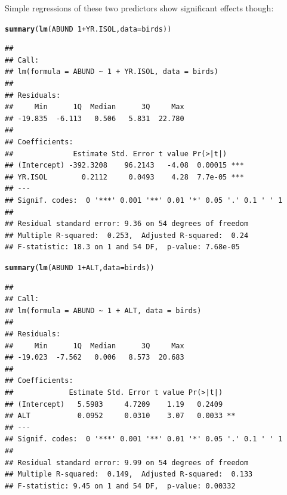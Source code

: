 \documentclass[12pt,a4paper]{scrartcl}\usepackage[]{graphicx}\usepackage[]{color}
\makeatletter
\newcommand{\hlnum}[1]{\textcolor[rgb]{0.686,0.059,0.569}{#1}}%
\newcommand{\hlopt}[1]{\textcolor[rgb]{0,0,0}{#1}}%
\newcommand{\hlstd}[1]{\textcolor[rgb]{0.345,0.345,0.345}{#1}}%
\newcommand{\hlkwc}[1]{\textcolor[rgb]{0.333,0.667,0.333}{#1}}%
\newcommand{\hlkwd}[1]{\textcolor[rgb]{0.737,0.353,0.396}{\textbf{#1}}}%
\newenvironment{kframe}{%
 \def\at@end@of@kframe{}%
 \ifinner\ifhmode%
  \def\at@end@of@kframe{\end{minipage}}%
  \begin{minipage}{\columnwidth}%
 \fi\fi%
 \def\FrameCommand##1{\hskip\@totalleftmargin \hskip-\fboxsep
 \colorbox{shadecolor}{##1}\hskip-\fboxsep
     \hskip-\linewidth \hskip-\@totalleftmargin \hskip\columnwidth}%
 \MakeFramed {\advance\hsize-\width
   \@totalleftmargin\z@ \linewidth\hsize
   \@setminipage}}%
 {\par\unskip\endMakeFramed%
 \at@end@of@kframe}
\newenvironment{knitrout}{}{} %
\makeatother
\begin{document}
\begin{Answer}
Simple regressions of these two predictors show significant effects though:
\begin{knitrout}
\color{fgcolor}\begin{kframe}
\begin{alltt}
\hlkwd{summary}\hlstd{(}\hlkwd{lm}\hlstd{(ABUND} \hlopt{~} \hlnum{1} \hlopt{+} \hlstd{YR.ISOL ,} \hlkwc{data} \hlstd{= birds))}
\end{alltt}
\begin{verbatim}
## 
## Call:
## lm(formula = ABUND ~ 1 + YR.ISOL, data = birds)
## 
## Residuals:
##     Min      1Q  Median      3Q     Max 
## -19.835  -6.113   0.506   5.831  22.780 
## 
## Coefficients:
##              Estimate Std. Error t value Pr(>|t|)    
## (Intercept) -392.3208    96.2143   -4.08  0.00015 ***
## YR.ISOL        0.2112     0.0493    4.28  7.7e-05 ***
## ---
## Signif. codes:  0 '***' 0.001 '**' 0.01 '*' 0.05 '.' 0.1 ' ' 1
## 
## Residual standard error: 9.36 on 54 degrees of freedom
## Multiple R-squared:  0.253,	Adjusted R-squared:  0.24 
## F-statistic: 18.3 on 1 and 54 DF,  p-value: 7.68e-05
\end{verbatim}
\begin{alltt}
\hlkwd{summary}\hlstd{(}\hlkwd{lm}\hlstd{(ABUND} \hlopt{~} \hlnum{1} \hlopt{+} \hlstd{ALT,} \hlkwc{data} \hlstd{= birds))}
\end{alltt}
\begin{verbatim}
## 
## Call:
## lm(formula = ABUND ~ 1 + ALT, data = birds)
## 
## Residuals:
##     Min      1Q  Median      3Q     Max 
## -19.023  -7.562   0.006   8.573  20.683 
## 
## Coefficients:
##             Estimate Std. Error t value Pr(>|t|)   
## (Intercept)   5.5983     4.7209    1.19   0.2409   
## ALT           0.0952     0.0310    3.07   0.0033 **
## ---
## Signif. codes:  0 '***' 0.001 '**' 0.01 '*' 0.05 '.' 0.1 ' ' 1
## 
## Residual standard error: 9.99 on 54 degrees of freedom
## Multiple R-squared:  0.149,	Adjusted R-squared:  0.133 
## F-statistic: 9.45 on 1 and 54 DF,  p-value: 0.00332
\end{verbatim}
\end{kframe}
\end{knitrout}


\end{Answer}
\end{document}
